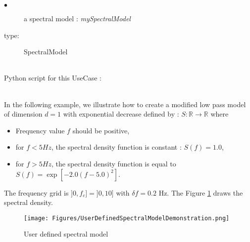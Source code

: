 {
  \begin{description}
  \item[$\bullet$] a spectral model : {\itshape mySpectralModel}
  \item[type:] SpectralModel
  \end{description}

}

\textspace\\
Python script for this UseCase :


\textspace\\

In the following example, we illustrate how to create a modified low pass model of dimension $d=1$ with exponential decrease defined by : $S : \mathbb{R} \rightarrow  \mathbb{R} $ where
\begin{itemize}
\item Frequency value $f$ should be positive,
\item for $f < 5 Hz$, the spectral density function is constant : $S(f)=1.0$,
\item for $f > 5 Hz$, the spectral density function is equal to $S(f) = \exp \left[- 2.0 (f - 5.0)^2 \right]$.
\end{itemize}
The frequency grid is $]0, f_c] = ]0,10]$ with $\delta f = 0.2$ Hz. The Figure \ref{UserDefinedSpectralModelDemonstration} draws the  spectral density.

        \begin{figure}[H]
          \begin{center}
            \texttt{[image: Figures/UserDefinedSpectralModelDemonstration.png]}
            \caption{User defined spectral model}
            \label{UserDefinedSpectralModelDemonstration}
          \end{center}
        \end{figure}
